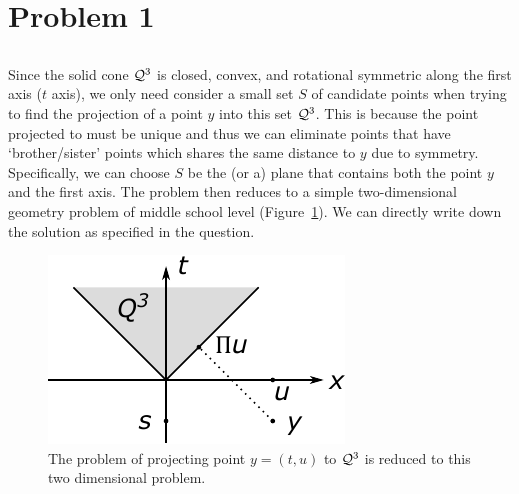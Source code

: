 \section{Problem 1}

\subsection{} %

Since the solid cone $\mathcal{Q}^3$ is closed, convex,
and rotational symmetric along the first axis ($t$ axis),
we only need consider a small set $S$ of candidate points
when trying to find the projection of a point $y$ into this set $\mathcal{Q}^3$.
This is because the point projected to must be unique
and thus we can eliminate points that have `brother/sister' points which
shares the same distance to $y$ due to symmetry.
Specifically, we can choose $S$ be the (or a) plane that contains
both the point $y$ and the first axis.
The problem then reduces to a simple two-dimensional geometry problem
of middle school level (Figure~\ref{fig:1}).
We can directly write down the solution as specified in the question.

\begin{figure}[ht]
\centering
    \includegraphics[width=0.36\linewidth]{figure/fig1}
    \caption{\small
    The problem of projecting point $y=(t,u)$ to $\mathcal{Q}^3$ is
    reduced to this two dimensional problem.}
    \label{fig:1}
\end{figure}

